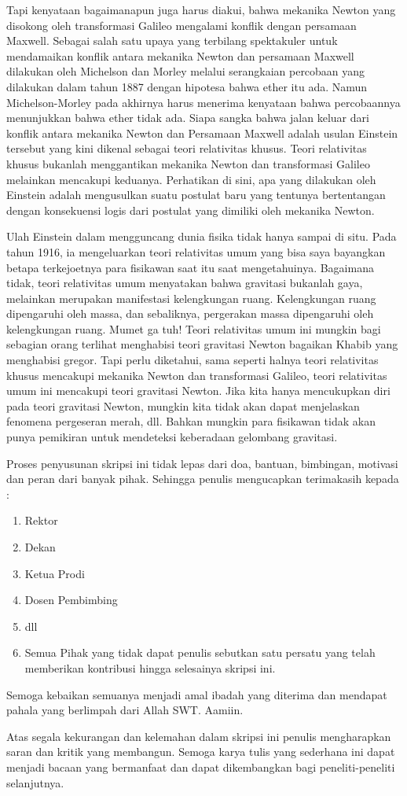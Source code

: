 Tapi kenyataan bagaimanapun juga harus diakui, bahwa mekanika Newton yang disokong oleh transformasi Galileo mengalami konflik dengan persamaan Maxwell. Sebagai salah satu upaya yang terbilang spektakuler untuk mendamaikan konflik antara mekanika Newton dan persamaan Maxwell dilakukan oleh Michelson dan Morley melalui serangkaian percobaan yang dilakukan dalam tahun 1887 dengan hipotesa bahwa ether itu ada. Namun Michelson-Morley pada akhirnya harus menerima kenyataan bahwa percobaannya menunjukkan bahwa ether tidak ada. Siapa sangka bahwa jalan keluar dari konflik antara mekanika Newton dan Persamaan Maxwell adalah usulan Einstein tersebut yang kini dikenal sebagai teori relativitas khusus. Teori relativitas khusus bukanlah menggantikan mekanika Newton dan transformasi Galileo melainkan mencakupi keduanya. Perhatikan di sini, apa yang dilakukan oleh Einstein adalah mengusulkan suatu postulat baru yang tentunya bertentangan dengan konsekuensi logis dari postulat yang dimiliki oleh mekanika Newton. 

Ulah Einstein dalam mengguncang dunia fisika tidak hanya sampai di situ. Pada tahun 1916, ia mengeluarkan teori relativitas umum yang bisa saya bayangkan betapa terkejoetnya para fisikawan saat itu saat mengetahuinya. Bagaimana tidak, teori relativitas umum menyatakan bahwa gravitasi bukanlah gaya, melainkan merupakan manifestasi kelengkungan ruang. Kelengkungan ruang dipengaruhi oleh massa, dan sebaliknya, pergerakan massa dipengaruhi oleh kelengkungan ruang. Mumet ga tuh! Teori relativitas umum ini mungkin bagi sebagian orang terlihat  menghabisi teori gravitasi Newton bagaikan Khabib yang menghabisi gregor. Tapi perlu diketahui, sama seperti halnya teori relativitas khusus mencakupi mekanika Newton dan transformasi Galileo, teori relativitas umum ini mencakupi teori gravitasi Newton. Jika kita hanya mencukupkan diri pada teori gravitasi Newton, mungkin kita tidak akan dapat menjelaskan fenomena pergeseran merah, dll. Bahkan mungkin para fisikawan tidak akan punya pemikiran untuk mendeteksi keberadaan gelombang gravitasi.

Proses penyusunan skripsi ini tidak lepas dari doa, bantuan,
bimbingan, motivasi dan peran dari banyak pihak. Sehingga penulis mengucapkan terimakasih kepada :
\begin{enumerate}
\item Rektor
\item Dekan
\item Ketua Prodi
\item Dosen Pembimbing
\item dll
\item Semua Pihak yang tidak dapat penulis sebutkan satu persatu yang telah memberikan kontribusi hingga selesainya skripsi ini.
\end{enumerate}
Semoga kebaikan semuanya menjadi amal ibadah yang diterima dan mendapat pahala yang berlimpah dari Allah SWT. Aamiin.

Atas segala kekurangan dan kelemahan dalam skripsi ini penulis mengharapkan saran dan kritik yang membangun.
Semoga karya tulis yang sederhana ini dapat menjadi bacaan yang bermanfaat dan dapat dikembangkan bagi peneliti-peneliti selanjutnya. 

